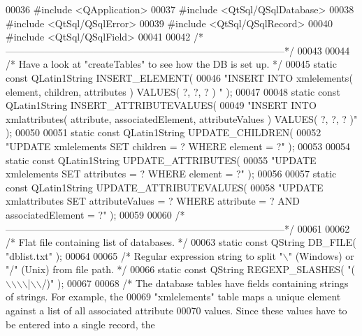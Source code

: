 \begin{DoxyCode}
00036 \textcolor{preprocessor}{#include <QApplication>}
00037 \textcolor{preprocessor}{#include <QtSql/QSqlDatabase>}
00038 \textcolor{preprocessor}{#include <QtSql/QSqlError>}
00039 \textcolor{preprocessor}{#include <QtSql/QSqlRecord>}
00040 \textcolor{preprocessor}{#include <QtSql/QSqlField>}
00041 
00042 \textcolor{comment}{/*
      --------------------------------------------------------------------------------------*/}
00043 
00044 \textcolor{comment}{/* Have a look at "createTables" to see how the DB is set up. */}
00045 \textcolor{keyword}{static} \textcolor{keyword}{const} QLatin1String INSERT\_ELEMENT(
00046     \textcolor{stringliteral}{"INSERT INTO xmlelements( element, children, attributes ) VALUES( ?, ?, ? )
      "} );
00047 
00048 \textcolor{keyword}{static} \textcolor{keyword}{const} QLatin1String INSERT\_ATTRIBUTEVALUES(
00049     \textcolor{stringliteral}{"INSERT INTO xmlattributes( attribute, associatedElement, attributeValues )
       VALUES( ?, ?, ? )"} );
00050 
00051 \textcolor{keyword}{static} \textcolor{keyword}{const} QLatin1String UPDATE\_CHILDREN(
00052     \textcolor{stringliteral}{"UPDATE xmlelements SET children = ? WHERE element = ?"} );
00053 
00054 \textcolor{keyword}{static} \textcolor{keyword}{const} QLatin1String UPDATE\_ATTRIBUTES(
00055     \textcolor{stringliteral}{"UPDATE xmlelements SET attributes = ? WHERE element = ?"} );
00056 
00057 \textcolor{keyword}{static} \textcolor{keyword}{const} QLatin1String UPDATE\_ATTRIBUTEVALUES(
00058     \textcolor{stringliteral}{"UPDATE xmlattributes SET attributeValues = ? WHERE attribute = ? AND
       associatedElement = ?"} );
00059 
00060 \textcolor{comment}{/*
      --------------------------------------------------------------------------------------*/}
00061 
00062 \textcolor{comment}{/* Flat file containing list of databases. */}
00063 \textcolor{keyword}{static} \textcolor{keyword}{const} QString DB\_FILE( \textcolor{stringliteral}{"dblist.txt"} );
00064 
00065 \textcolor{comment}{/* Regular expression string to split "\(\backslash\)" (Windows) or "/" (Unix) from file
       path. */}
00066 \textcolor{keyword}{static} \textcolor{keyword}{const} QString REGEXP\_SLASHES( \textcolor{stringliteral}{"(\(\backslash\)\(\backslash\)\(\backslash\)\(\backslash\)|\(\backslash\)\(\backslash\)/)"} );
00067 
00068 \textcolor{comment}{/* The database tables have fields containing strings of strings. For example,
       the}
00069 \textcolor{comment}{  "xmlelements" table maps a unique element against a list of all associated
       attribute}
00070 \textcolor{comment}{  values.  Since these values have to be entered into a single record, the
}
\end{DoxyCode}
